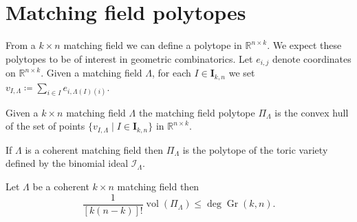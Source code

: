\documentclass[ALCO,ThmDefs,Unicode,epreuves]{cedram}
\DeclareMathOperator{\Gr}{Gr}
\DeclareMathOperator{\vol}{vol}
\begin{document}
\section{Matching field polytopes}

From a $k \times n$ matching field we can define a polytope in $\mathbb{R}^{n \times k}$. We expect these polytopes to be of interest in geometric combinatorics. Let $e_{i,j}$ denote coordinates on $\mathbb{R}^{n \times k}$. Given a matching field $\Lambda$, for each $I \in \mathbf{I}_{k,n}$ we set $v_{I, \Lambda} \coloneqq  \sum_{i \in I} e_{i, \Lambda(I)(i)}$. 

\begin{Definition}
Given a $k \times n$ matching field $\Lambda$ the matching field polytope $\Pi_ \Lambda$ is the convex hull of the set of points 
$\{ v_{I, \Lambda} \mid I \in \mathbf{I}_{k,n} \} $ in $\mathbb{R}^{n \times k}$. 
\end{Definition}


\begin{Proposition}
If $\Lambda$ is a coherent matching field then $\Pi_{\Lambda}$ is the polytope of the toric variety defined by the binomial ideal $\mathcal{I}_{\Lambda}$. 
\end{Proposition}


\begin{coro}
Let $\Lambda$ be a coherent $k \times n$ matching field then 
\[
\frac{1}{[k(n-k)]!}\vol(\Pi_{\Lambda}) \leq \deg \Gr(k, n).\] 
\end{coro}
\end{document}
